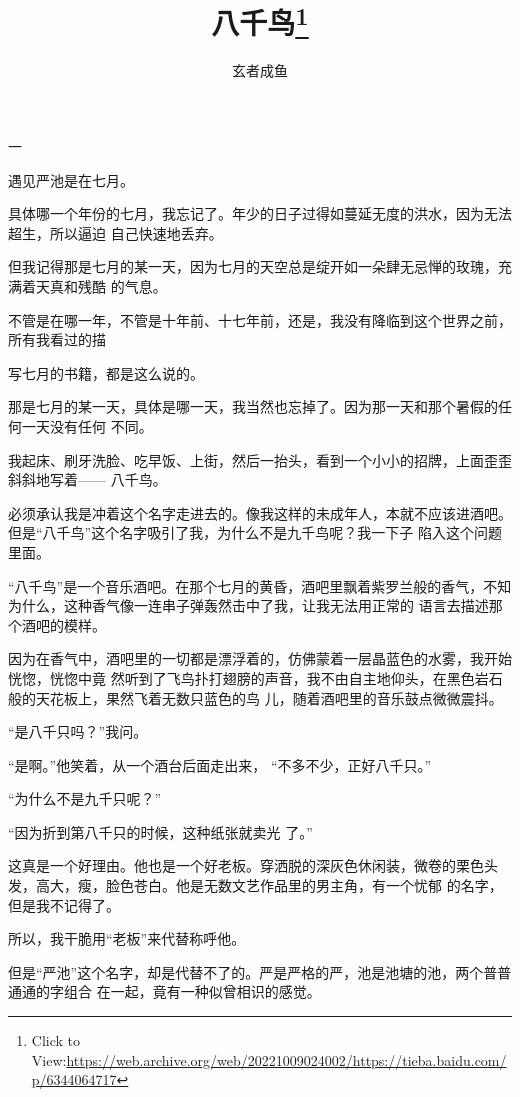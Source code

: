 \documentclass{article}
\title{八千鸟\footnote{Click to View:\url{https://web.archive.org/web/20221009024002/https://tieba.baidu.com/p/6344064717}}}
\author{玄者成鱼}
\date{}
\begin{document}

\maketitle


\Large


﻿一 


遇见严池是在七月。 

具体哪一个年份的七月，我忘记了。年少的日子过得如蔓延无度的洪水，因为无法超生，所以逼迫
自己快速地丢弃。 

但我记得那是七月的某一天，因为七月的天空总是绽开如一朵肆无忌惮的玫瑰，充满着天真和残酷
的气息。 

不管是在哪一年，不管是十年前、十七年前，还是，我没有降临到这个世界之前，所有我看过的描

\newpage
写七月的书籍，都是这么说的。 

那是七月的某一天，具体是哪一天，我当然也忘掉了。因为那一天和那个暑假的任何一天没有任何
不同。 

我起床、刷牙洗脸、吃早饭、上街，然后一抬头，看到一个小小的招牌，上面歪歪斜斜地写着——
八千鸟。 

必须承认我是冲着这个名字走进去的。像我这样的未成年人，本就不应该进酒吧。但是“八千鸟”这个名字吸引了我，为什么不是九千鸟呢？我一下子
陷入这个问题里面。 

“八千鸟”是一个音乐酒吧。在那个七月的黄昏，酒吧里飘着紫罗兰般的香气，不知为什么，这种香气像一连串子弹轰然击中了我，让我无法用正常的
语言去描述那个酒吧的模样。 

因为在香气中，酒吧里的一切都是漂浮着的，仿佛蒙着一层晶蓝色的水雾，我开始恍惚，恍惚中竟
\newpage
然听到了飞鸟扑打翅膀的声音，我不由自主地仰头，在黑色岩石般的天花板上，果然飞着无数只蓝色的鸟
儿，随着酒吧里的音乐鼓点微微震抖。 


“是八千只吗？”我问。 

“是啊。”他笑着，从一个酒台后面走出来，
“不多不少，正好八千只。” 


“为什么不是九千只呢？” 

“因为折到第八千只的时候，这种纸张就卖光
了。” 

这真是一个好理由。他也是一个好老板。穿洒脱的深灰色休闲装，微卷的栗色头发，高大，瘦，脸色苍白。他是无数文艺作品里的男主角，有一个忧郁
的名字，但是我不记得了。 


所以，我干脆用“老板”来代替称呼他。 

\newpage

但是“严池”这个名字，却是代替不了的。严是严格的严，池是池塘的池，两个普普通通的字组合
在一起，竟有一种似曾相识的感觉。 
\end{document}
